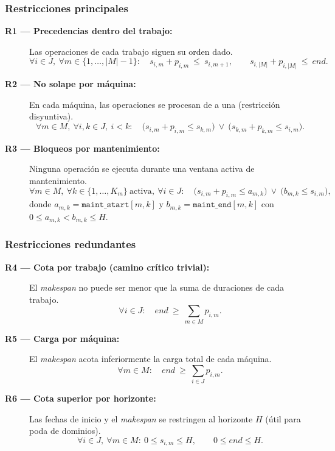 \subsubsection*{Restricciones principales}
\begin{description}
  \item[\textbf{R1 — Precedencias dentro del trabajo:}] Las operaciones de cada trabajo siguen su orden dado.  
  \[
  \forall i\in J,\ \forall m\in\{1,\dots,|M|-1\}:\quad
  s_{i,m}+p_{i,m}\ \le\ s_{i,m+1},
  \qquad
  s_{i,|M|}+p_{i,|M|}\ \le\ \textit{end}.
  \]

  \item[\textbf{R2 — No solape por máquina:}] En cada máquina, las operaciones se procesan de a una (restricción disyuntiva).  
  \[
  \forall m\in M,\ \forall i,k\in J,\ i<k:\quad
  \big(s_{i,m}+p_{i,m}\le s_{k,m}\big)\ \lor\ \big(s_{k,m}+p_{k,m}\le s_{i,m}\big).
  \]

  \item[\textbf{R3 — Bloqueos por mantenimiento:}] Ninguna operación se ejecuta durante una ventana activa de mantenimiento.  
  \[
  \forall m\in M,\ \forall k\in\{1,\dots,K_m\}\ \text{activa},\ \forall i\in J:\quad
  \big(s_{i,m}+p_{i,m}\le a_{m,k}\big)\ \lor\ \big(b_{m,k}\le s_{i,m}\big),
  \]
  donde \(a_{m,k}=\texttt{maint\_start}[m,k]\) y \(b_{m,k}=\texttt{maint\_end}[m,k]\) con \(0\le a_{m,k}<b_{m,k}\le H\).
\end{description}

\subsubsection*{Restricciones redundantes}
\begin{description}
  \item[\textbf{R4 — Cota por trabajo (camino crítico trivial):}] El \emph{makespan} no puede ser menor que la suma de duraciones de cada trabajo.  
  \[
  \forall i\in J:\quad \textit{end}\ \ge\ \sum_{m\in M} p_{i,m}.
  \]

  \item[\textbf{R5 — Carga por máquina:}] El \emph{makespan} acota inferiormente la carga total de cada máquina.  
  \[
  \forall m\in M:\quad \textit{end}\ \ge\ \sum_{i\in J} p_{i,m}.
  \]

  \item[\textbf{R6 — Cota superior por horizonte:}] Las fechas de inicio y el \emph{makespan} se restringen al horizonte \(H\) (útil para poda de dominios).  
  \[
  \forall i\in J,\ \forall m\in M:\ 0\le s_{i,m}\le H, 
  \qquad 0\le \textit{end}\le H.
  \]
\end{description}

